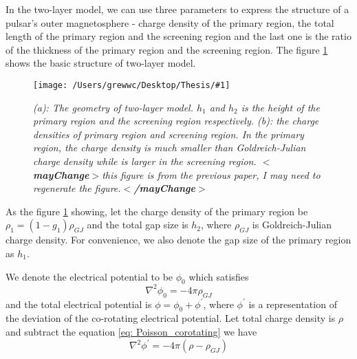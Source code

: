 \documentclass[12pt]{report}
\newcommand{\mycaption}[1]{\caption{\textit{\footnotesize #1}}}
\newcommand{\singleFig}[3]{
 \begin{figure}[!ht]
  \centering
  \texttt{[image: /Users/grewwc/Desktop/Thesis/\#1]}
  \mycaption{#3}
 \label{fig: #1}
 \end{figure} 
}
\newcommand{\mayChange}[1]{
  $<$\textbf{mayChange}$>$#1$<$\textbf{/mayChange}$>$
}
\newcommand{\myComment}[1]{
  \newline
}
\begin{document}
      In the two-layer model, we can use three parameters to express the structure of a pulsar's outer 
      magnetosphere - charge density of the primary region, the total length of the primary region and the 
      screening region and the last one is the ratio of the thickness of the primary region and the 
      screening region. The figure \ref{fig: charge_density} shows the basic structure of two-layer model. 

      \singleFig{charge_density}{0.6}{(a): The geometry of two-layer model. $h_{1}$ and $h_{2}$ is the height
      of the primary region and the screening region respectively. (b): the charge densities of primary region and 
      screening region. In the primary region, the charge density is much smaller than Goldreich-Julian charge density
      while is larger in the screening region. \mayChange{this figure is from the previous paper, I may need to 
      regenerate the figure.}}

      As the figure \ref{fig: charge_density} showing, 
      let the charge density of the primary region be $\rho_1 = (1-g_{1}) \rho_{GJ}$ and the total gap size is 
      $h_{2}$, where $\rho_{GJ}$ is Goldreich-Julian charge density. For convenience, 
      we also denote the gap size of the primary region as $h_{1}$. 
      \myComment{Then we can calculate electric potential and electric field by solving the Poisson equation }

      We denote the electrical potential to be $\phi_{0}$ which satisfies 
      \begin{equation}
        \label{eq: Poisson_corotating}
        \nabla^{2}\phi_{0} = -4\pi\rho_{GJ}
      \end{equation}
      and the total electrical potential is $\phi = \phi_{0} + \phi^{\prime}$, where $\phi^{\prime}$ is a 
      representation of the deviation of the co-rotating electrical potential.  
      Let total charge density is $\rho$ and subtract the equation \ref{eq: Poisson_corotating} we have 
      \begin{equation}
        \label{eq: Poisson_final}
        \nabla^{2}\phi^{\prime} = -4\pi\left(\rho - \rho_{GJ} \right)
      \end{equation}
\end{document}
